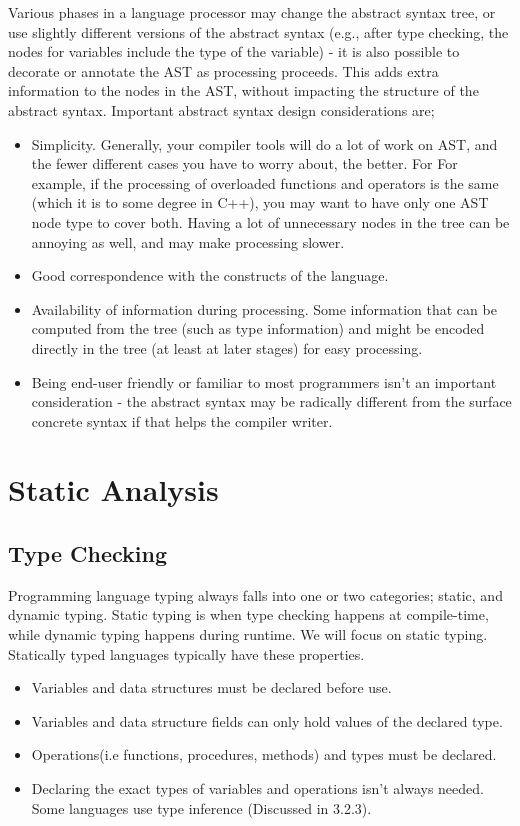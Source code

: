         Various phases in a language processor may change the abstract syntax
        tree, or use slightly different versions of the abstract syntax (e.g., after type
        checking, the nodes for variables include the type of the variable) - it is also
        possible to decorate or annotate the AST as processing proceeds. 
        This adds extra information to the nodes in the AST, without impacting the structure of the abstract syntax.
        Important abstract syntax design considerations are;
        \begin{itemize}
            \item Simplicity. Generally, your compiler tools will do a lot of work on AST,
            and the fewer different cases you have to worry about, the better. For
            For example, if the processing of overloaded functions and operators is the same (which it is to some degree in C++), you may want to have
            only one AST node type to cover both. Having a lot of unnecessary nodes
            in the tree can be annoying as well, and may make processing slower.
            \item Good correspondence with the constructs of the language.
            \item Availability of information during processing. Some information that
            can be computed from the tree (such as type information) and might be encoded directly in the tree (at least at later stages) for easy processing.
            \item Being end-user friendly or familiar to most programmers isn't an important consideration - the abstract syntax may be radically different from
            the surface concrete syntax if that helps the compiler writer.
        \end{itemize}

    \section{Static Analysis}
        \subsection{Type Checking}
        Programming language typing always falls into one or two categories; static, and dynamic typing. Static typing is when type checking happens at compile-time, 
        while dynamic typing happens during runtime. We will focus on static typing. 
        Statically typed languages typically have these properties.
        \begin{itemize}
            \item Variables and data structures must be declared before use.
            \item Variables and data structure fields can only hold values of the declared type.
            \item Operations(i.e functions, procedures, methods) and types must be declared.
            \item Declaring the exact types of variables and operations isn't always needed. Some languages use type inference (Discussed in 3.2.3).
        \end{itemize}

